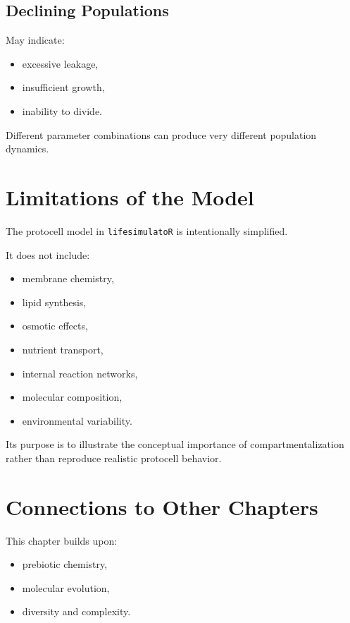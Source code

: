 \documentclass[
  oneside,
  openany]{book}
\providecommand{\tightlist}{%
  \setlength{\itemsep}{0pt}\setlength{\parskip}{0pt}}
\begin{document}
\subsection{Declining Populations}\label{declining-populations}

May indicate:

\begin{itemize}
\tightlist
\item
  excessive leakage,
\item
  insufficient growth,
\item
  inability to divide.
\end{itemize}

Different parameter combinations can produce very different population dynamics.

\section{Limitations of the Model}\label{limitations-of-the-model-2}

The protocell model in \texttt{lifesimulatoR} is intentionally simplified.

It does not include:

\begin{itemize}
\tightlist
\item
  membrane chemistry,
\item
  lipid synthesis,
\item
  osmotic effects,
\item
  nutrient transport,
\item
  internal reaction networks,
\item
  molecular composition,
\item
  environmental variability.
\end{itemize}

Its purpose is to illustrate the conceptual importance of compartmentalization rather than reproduce realistic protocell behavior.

\section{Connections to Other Chapters}\label{connections-to-other-chapters-1}

This chapter builds upon:

\begin{itemize}
\tightlist
\item
  prebiotic chemistry,
\item
  molecular evolution,
\item
  diversity and complexity.
\end{itemize}
\end{document}
